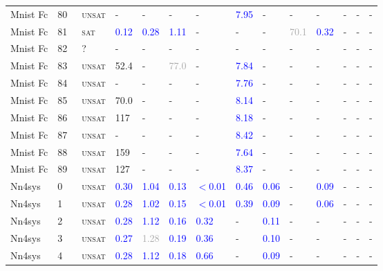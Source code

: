 \begin{center}
{\begin{longtable}{@{}llllllllllllll@{}}
Mnist Fc & 80 & ~\textsc{unsat} & - & - & - & - & \textcolor{blue}{7.95} & - & - & - & - & - & - \\
Mnist Fc & 81 & ~\textsc{sat} & \textcolor{blue}{0.12} & \textcolor{blue}{0.28} & \textcolor{blue}{1.11} & - & - & - & \textcolor{darkgray}{70.1} & \textcolor{blue}{0.32} & - & - & - \\
Mnist Fc & 82 & ~? & - & - & - & - & - & - & - & - & - & - & - \\
Mnist Fc & 83 & ~\textsc{unsat} & \textcolor{second}{52.4} & - & \textcolor{darkgray}{77.0} & - & \textcolor{blue}{7.84} & - & - & - & - & - & - \\
Mnist Fc & 84 & ~\textsc{unsat} & - & - & - & - & \textcolor{blue}{7.76} & - & - & - & - & - & - \\
Mnist Fc & 85 & ~\textsc{unsat} & \textcolor{second}{70.0} & - & - & - & \textcolor{blue}{8.14} & - & - & - & - & - & - \\
Mnist Fc & 86 & ~\textsc{unsat} & \textcolor{second}{117} & - & - & - & \textcolor{blue}{8.18} & - & - & - & - & - & - \\
Mnist Fc & 87 & ~\textsc{unsat} & - & - & - & - & \textcolor{blue}{8.42} & - & - & - & - & - & - \\
Mnist Fc & 88 & ~\textsc{unsat} & \textcolor{second}{159} & - & - & - & \textcolor{blue}{7.64} & - & - & - & - & - & - \\
Mnist Fc & 89 & ~\textsc{unsat} & \textcolor{second}{127} & - & - & - & \textcolor{blue}{8.37} & - & - & - & - & - & - \\
\midrule
Nn4sys & 0 & ~\textsc{unsat} & \textcolor{blue}{0.30} & \textcolor{blue}{1.04} & \textcolor{blue}{0.13} & \textcolor{blue}{$<$0.01} & \textcolor{blue}{0.46} & \textcolor{blue}{0.06} & - & \textcolor{blue}{0.09} & - & - & - \\
Nn4sys & 1 & ~\textsc{unsat} & \textcolor{blue}{0.28} & \textcolor{blue}{1.02} & \textcolor{blue}{0.15} & \textcolor{blue}{$<$0.01} & \textcolor{blue}{0.39} & \textcolor{blue}{0.09} & - & \textcolor{blue}{0.06} & - & - & - \\
Nn4sys & 2 & ~\textsc{unsat} & \textcolor{blue}{0.28} & \textcolor{blue}{1.12} & \textcolor{blue}{0.16} & \textcolor{blue}{0.32} & - & \textcolor{blue}{0.11} & - & - & - & - & - \\
Nn4sys & 3 & ~\textsc{unsat} & \textcolor{blue}{0.27} & \textcolor{darkgray}{1.28} & \textcolor{blue}{0.19} & \textcolor{blue}{0.36} & - & \textcolor{blue}{0.10} & - & - & - & - & - \\
Nn4sys & 4 & ~\textsc{unsat} & \textcolor{blue}{0.28} & \textcolor{blue}{1.12} & \textcolor{blue}{0.18} & \textcolor{blue}{0.66} & - & \textcolor{blue}{0.09} & - & - & - & - & - \\

\end{longtable}}
\end{center}
